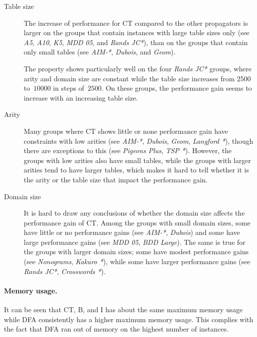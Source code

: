\documentclass[a4paper,11pt]{article}
\numberwithin{equation}{section}
\begin{document}
\begin{description}
  \item[Table size] The increase
    of performance for CT compared to the other propagators
    is larger on the groups that contain 
    instances with large table sizes only (see \emph{A5}, \emph{A10},
    \emph{K5}, \emph{MDD 05}, and \emph{Rands JC*}), than on the groups
    that contain only small tables (see \emph{AIM-*}, \emph{Dubois}, and \emph{Geom}).
    
    The property shows particularly well on the four \emph{Rands JC*} groups, where
    arity and domain size are constant while the table size increases from
    $2500$ to~$10000$ in steps of~$2500$. On these groups, the performance gain
    seems to increase with an increasing table size.

    \item[Arity] Many groups where CT shows little or none performance gain have
      constraints with low arities (see \emph{AIM-*}, \emph{Dubois}, \emph{Geom},
      \emph{Langford *}), though there are exceptions to this (see \emph{Pigeons Plus},
      \emph{TSP *}). 
      However, the groups with low arities also have small tables, while the groups
      with larger arities tend to have larger tables, which makes it hard to
      tell whether it is the arity or the table size that impact the performance gain.
      
    \item[Domain size] It is hard to draw any conclusions of whether the domain size affects
      the performance gain of CT. Among the groups with small domain sizes, some
      have little or no performance gains (see \emph{AIM-*}, \emph{Dubois}) and
      some have large performance gains (see \emph{MDD 05}, \emph{BDD Large}).
      The same is true for the groups with larger domain sizes; some have
      modest performance gains (see \emph{Nonograms}, \emph{Kakuro *}),
      while some have larger performance gains (see \emph{Rands JC*}, \emph{Crosswords *}).
\end{description}

\paragraph{Memory usage.}
It can be seen that CT, B, and I has about the same maximum memory usage 
while DFA consistently has a higher maximum memory usage. This complies with
the fact that DFA ran out of memory on the highest number of instances.
  
\end{document}
